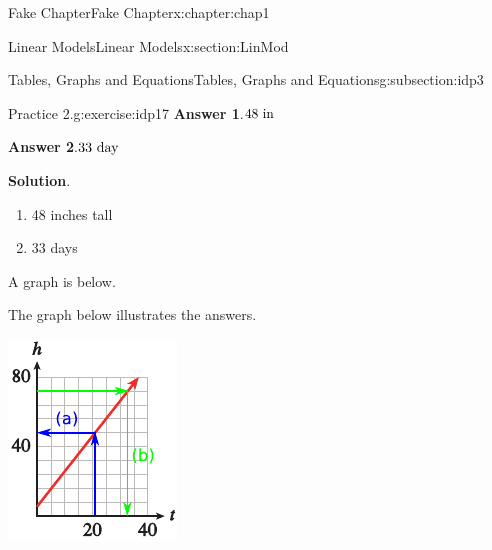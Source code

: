 \documentclass[oneside,10pt,]{book}
\newcommand{\blocktitlefont}{\relax}
\numberwithin{equation}{section}
\begin{document}
\begin{chapterptx}{Fake Chapter}{}{Fake Chapter}{}{}{x:chapter:chap1}
\begin{sectionptx}{Linear Models}{}{Linear Models}{}{}{x:section:LinMod}
\begin{subsectionptx}{Tables, Graphs and Equations}{}{Tables, Graphs and Equations}{}{}{g:subsection:idp3}
\begin{inlineexercise}{Practice 2.}{g:exercise:idp17}
\noindent\textbf{\blocktitlefont Answer 1}.\hypertarget{g:answer:idp18}{}\quad{}\(48\ {\rm in}\)%
\par\smallskip%
\noindent\textbf{\blocktitlefont Answer 2}.\hypertarget{g:answer:idp19}{}\quad{}\(33\ {\rm day}\)%
\par\smallskip%
\noindent\textbf{\blocktitlefont Solution}.\hypertarget{g:solution:idp20}{}\quad{}%
\begin{enumerate}[label=\alph*.]
\item{}48 inches tall%
\item{}33 days%
\end{enumerate}
%
\par
A graph is below.%
\par\medskip\noindent The graph below illustrates the answers.%
\begin{sidebyside}{1}{0}{0.75}{0}%
\begin{sbspanel}{0.25}%
\includegraphics[width=\linewidth]{external/photos/fig-in-ex-ans-1-1-2.pdf}
\end{sbspanel}%
\end{sidebyside}%
\par

\end{inlineexercise}
\end{subsectionptx}
\end{sectionptx}
\end{chapterptx}
\end{document}
